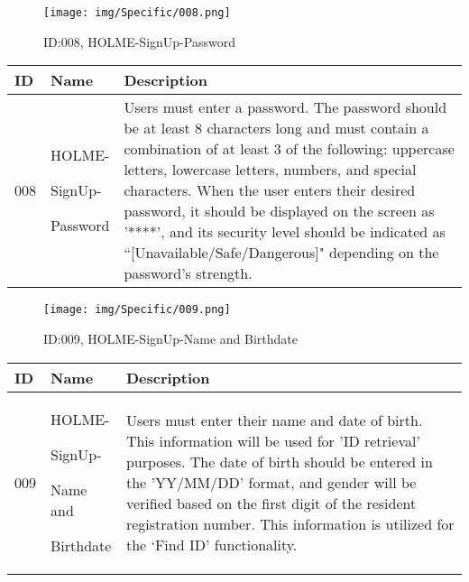 \documentclass[conference]{IEEEtran}
\begin{document}
\begin{enumerate}
\begin{figure}[h]
\centering
\texttt{[image: img/Specific/008.png]}
\caption{ID:008, HOLME-SignUp-Password}
\end{figure}
\begin{table}[h]
\def\arraystretch{1.2} \small
    \begin{tabular}{|p{1cm}|p{1.8cm}|p{5.0cm}|}
        \hline
        ID & Name & Description\\ \hline
         008 \par  & HOLME-\par SignUp- \par Password &Users must enter a password. The password should be at least 8 characters long and must contain a combination of at least 3 of the following: uppercase letters, lowercase letters, numbers, and special characters. When the user enters their desired password, it should be displayed on the screen as '****', and its security level should be indicated as ``[Unavailable/Safe/Dangerous]" depending on the password's strength.\\ \hline
	\end{tabular}
\end{table}

\begin{figure}[h]
\centering
\texttt{[image: img/Specific/009.png]}
\caption{ID:009, HOLME-SignUp-Name and Birthdate}
\end{figure}
\begin{table}[h]
\def\arraystretch{1.2} \small
    \begin{tabular}{|p{1cm}|p{1.8cm}|p{5.0cm}|}
        \hline
        ID & Name & Description\\ \hline
         009 \par  & HOLME-\par SignUp-\par Name and \par Birthdate &Users must enter their name and date of birth. This information will be used for 'ID retrieval' purposes. The date of birth should be entered in the 'YY/MM/DD' format, and gender will be verified based on the first digit of the resident registration number.
This information is utilized for the `Find ID' functionality.\\ \hline
	\end{tabular}
\end{table}


\end{enumerate}
\end{document}
